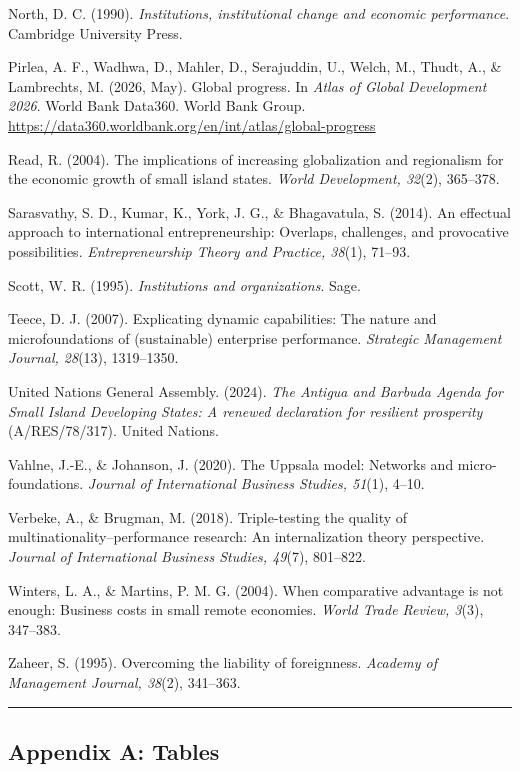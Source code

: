 \documentclass[12pt,a4paper]{article}
\begin{document}
North, D. C. (1990). \emph{Institutions, institutional change and
economic performance}. Cambridge University Press.

Pirlea, A. F., Wadhwa, D., Mahler, D., Serajuddin, U., Welch, M., Thudt,
A., \& Lambrechts, M. (2026, May). Global progress. In \emph{Atlas of
Global Development 2026}. World Bank Data360. World Bank Group.
\url{https://data360.worldbank.org/en/int/atlas/global-progress}

Read, R. (2004). The implications of increasing globalization and
regionalism for the economic growth of small island states. \emph{World
Development, 32}(2), 365--378.

Sarasvathy, S. D., Kumar, K., York, J. G., \& Bhagavatula, S. (2014). An
effectual approach to international entrepreneurship: Overlaps,
challenges, and provocative possibilities. \emph{Entrepreneurship Theory
and Practice, 38}(1), 71--93.

Scott, W. R. (1995). \emph{Institutions and organizations}. Sage.

Teece, D. J. (2007). Explicating dynamic capabilities: The nature and
microfoundations of (sustainable) enterprise performance.
\emph{Strategic Management Journal, 28}(13), 1319--1350.

United Nations General Assembly. (2024). \emph{The Antigua and Barbuda
Agenda for Small Island Developing States: A renewed declaration for
resilient prosperity} (A/RES/78/317). United Nations.

Vahlne, J.-E., \& Johanson, J. (2020). The Uppsala model: Networks and
micro-foundations. \emph{Journal of International Business Studies,
51}(1), 4--10.

Verbeke, A., \& Brugman, M. (2018). Triple-testing the quality of
multinationality--performance research: An internalization theory
perspective. \emph{Journal of International Business Studies, 49}(7),
801--822.

Winters, L. A., \& Martins, P. M. G. (2004). When comparative advantage
is not enough: Business costs in small remote economies. \emph{World
Trade Review, 3}(3), 347--383.

Zaheer, S. (1995). Overcoming the liability of foreignness.
\emph{Academy of Management Journal, 38}(2), 341--363.

\begin{center}\rule{0.5\linewidth}{0.5pt}\end{center}

\hypertarget{appendix-a-tables}{%
\subsection{Appendix A: Tables}\label{appendix-a-tables}}
\end{document}
